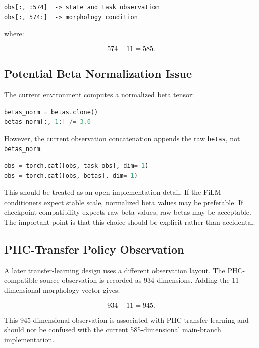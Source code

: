 \documentclass[11pt,a4paper]{article}
\begin{document}
\begin{lstlisting}
obs[:, :574]  -> state and task observation
obs[:, 574:]  -> morphology condition
\end{lstlisting}

where:

\begin{equation}
    574 + 11 = 585.
\end{equation}

\subsection{Potential Beta Normalization Issue}

The current environment computes a normalized beta tensor:

\begin{lstlisting}[language=Python]
betas_norm = betas.clone()
betas_norm[:, 1:] /= 3.0
\end{lstlisting}

However, the current observation concatenation appends the raw \texttt{betas}, not \texttt{betas\_norm}:

\begin{lstlisting}[language=Python]
obs = torch.cat([obs, task_obs], dim=-1)
obs = torch.cat([obs, betas], dim=-1)
\end{lstlisting}

This should be treated as an open implementation detail. If the FiLM conditioners expect stable scale, normalized beta values may be preferable. If checkpoint compatibility expects raw beta values, raw betas may be acceptable. The important point is that this choice should be explicit rather than accidental.

\subsection{PHC-Transfer Policy Observation}

A later transfer-learning design uses a different observation layout. The PHC-compatible source observation is recorded as 934 dimensions. Adding the 11-dimensional morphology vector gives:

\begin{equation}
    934 + 11 = 945.
\end{equation}

This 945-dimensional observation is associated with PHC transfer learning and should not be confused with the current 585-dimensional main-branch implementation.
\end{document}
